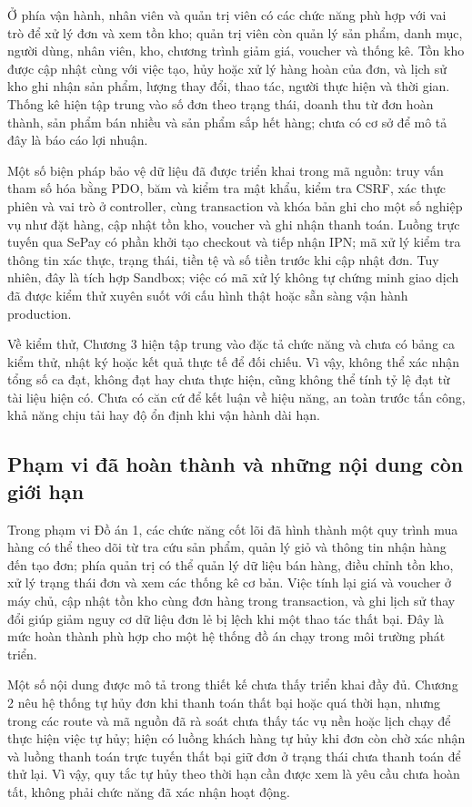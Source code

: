 Ở phía vận hành, nhân viên và quản trị viên có các chức năng phù hợp với vai trò để xử lý đơn và xem tồn kho; quản trị viên còn quản lý sản phẩm, danh mục, người dùng, nhân viên, kho, chương trình giảm giá, voucher và thống kê. Tồn kho được cập nhật cùng với việc tạo, hủy hoặc xử lý hàng hoàn của đơn, và lịch sử kho ghi nhận sản phẩm, lượng thay đổi, thao tác, người thực hiện và thời gian. Thống kê hiện tập trung vào số đơn theo trạng thái, doanh thu từ đơn hoàn thành, sản phẩm bán nhiều và sản phẩm sắp hết hàng; chưa có cơ sở để mô tả đây là báo cáo lợi nhuận.

Một số biện pháp bảo vệ dữ liệu đã được triển khai trong mã nguồn: truy vấn tham số hóa bằng PDO, băm và kiểm tra mật khẩu, kiểm tra CSRF, xác thực phiên và vai trò ở controller, cùng transaction và khóa bản ghi cho một số nghiệp vụ như đặt hàng, cập nhật tồn kho, voucher và ghi nhận thanh toán. Luồng trực tuyến qua SePay có phần khởi tạo checkout và tiếp nhận IPN; mã xử lý kiểm tra thông tin xác thực, trạng thái, tiền tệ và số tiền trước khi cập nhật đơn. Tuy nhiên, đây là tích hợp Sandbox; việc có mã xử lý không tự chứng minh giao dịch đã được kiểm thử xuyên suốt với cấu hình thật hoặc sẵn sàng vận hành production.

Về kiểm thử, Chương 3 hiện tập trung vào đặc tả chức năng và chưa có bảng ca kiểm thử, nhật ký hoặc kết quả thực tế để đối chiếu. Vì vậy, không thể xác nhận tổng số ca đạt, không đạt hay chưa thực hiện, cũng không thể tính tỷ lệ đạt từ tài liệu hiện có. Chưa có căn cứ để kết luận về hiệu năng, an toàn trước tấn công, khả năng chịu tải hay độ ổn định khi vận hành dài hạn.

\subsection{Phạm vi đã hoàn thành và những nội dung còn giới hạn}

Trong phạm vi Đồ án 1, các chức năng cốt lõi đã hình thành một quy trình mua hàng có thể theo dõi từ tra cứu sản phẩm, quản lý giỏ và thông tin nhận hàng đến tạo đơn; phía quản trị có thể quản lý dữ liệu bán hàng, điều chỉnh tồn kho, xử lý trạng thái đơn và xem các thống kê cơ bản. Việc tính lại giá và voucher ở máy chủ, cập nhật tồn kho cùng đơn hàng trong transaction, và ghi lịch sử thay đổi giúp giảm nguy cơ dữ liệu đơn lẻ bị lệch khi một thao tác thất bại. Đây là mức hoàn thành phù hợp cho một hệ thống đồ án chạy trong môi trường phát triển.

Một số nội dung được mô tả trong thiết kế chưa thấy triển khai đầy đủ. Chương 2 nêu hệ thống tự hủy đơn khi thanh toán thất bại hoặc quá thời hạn, nhưng trong các route và mã nguồn đã rà soát chưa thấy tác vụ nền hoặc lịch chạy để thực hiện việc tự hủy; hiện có luồng khách hàng tự hủy khi đơn còn chờ xác nhận và luồng thanh toán trực tuyến thất bại giữ đơn ở trạng thái chưa thanh toán để thử lại. Vì vậy, quy tắc tự hủy theo thời hạn cần được xem là yêu cầu chưa hoàn tất, không phải chức năng đã xác nhận hoạt động.

